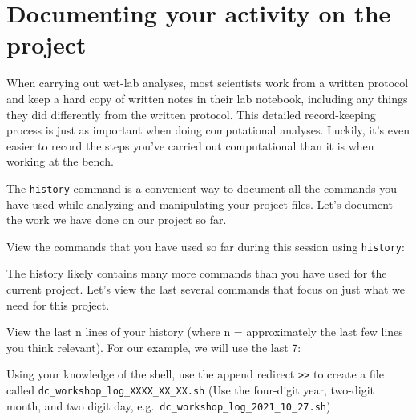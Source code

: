 \documentclass[
  letterpaper,
  DIV=11,
  numbers=noendperiod]{scrreprt}
\newenvironment{Shaded}{\begin{snugshade}}{\end{snugshade}}
\newcommand{\AttributeTok}[1]{\textcolor[rgb]{0.40,0.45,0.13}{#1}}
\newcommand{\ExtensionTok}[1]{\textcolor[rgb]{0.00,0.23,0.31}{#1}}
\newcommand{\FunctionTok}[1]{\textcolor[rgb]{0.28,0.35,0.67}{#1}}
\newcommand{\KeywordTok}[1]{\textcolor[rgb]{0.00,0.23,0.31}{\textbf{#1}}}
\newcommand{\NormalTok}[1]{\textcolor[rgb]{0.00,0.23,0.31}{#1}}
\begin{document}
\section{Documenting your activity on the
project}\label{documenting-your-activity-on-the-project}

When carrying out wet-lab analyses, most scientists work from a written
protocol and keep a hard copy of written notes in their lab notebook,
including any things they did differently from the written protocol.
This detailed record-keeping process is just as important when doing
computational analyses. Luckily, it's even easier to record the steps
you've carried out computational than it is when working at the bench.

The \texttt{history} command is a convenient way to document all the
commands you have used while analyzing and manipulating your project
files. Let's document the work we have done on our project so far.

View the commands that you have used so far during this session using
\texttt{history}:

\begin{Shaded}
\end{Shaded}

The history likely contains many more commands than you have used for
the current project. Let's view the last several commands that focus on
just what we need for this project.

View the last n lines of your history (where n = approximately the last
few lines you think relevant). For our example, we will use the last 7:

\begin{Shaded}
\end{Shaded}

\begin{tcolorbox}[enhanced jigsaw, opacitybacktitle=0.6, colback=white, coltitle=black, opacityback=0, rightrule=.15mm, toptitle=1mm, toprule=.15mm, bottomtitle=1mm, colframe=quarto-callout-caution-color-frame, arc=.35mm, titlerule=0mm, colbacktitle=quarto-callout-caution-color!10!white, leftrule=.75mm, title={Exercise}, breakable, bottomrule=.15mm, left=2mm]

Using your knowledge of the shell, use the append redirect
\texttt{\textgreater{}\textgreater{}} to create a file called
\texttt{dc\_workshop\_log\_XXXX\_XX\_XX.sh} (Use the four-digit year,
two-digit month, and two digit day,
e.g.~\texttt{dc\_workshop\_log\_2021\_10\_27.sh})

\end{tcolorbox}
\end{document}

